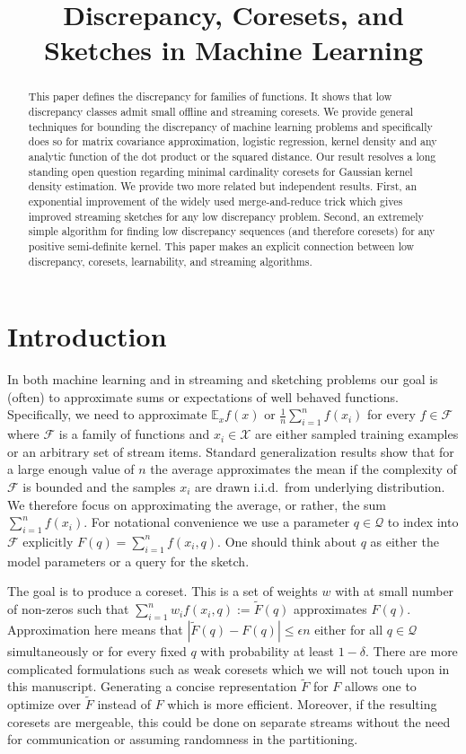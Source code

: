 \documentclass[anon,12pt]{colt2019} %
\title[Discrepancy, Coresets, and Sketches in Machine Learning]{Discrepancy, Coresets, and Sketches in Machine Learning}
\newcommand{\E}{\mathbb{E}}
\newcommand{\eps}{\epsilon}
\newcommand{\F}{\mathcal{F}}
\begin{document}
\maketitle

\begin{abstract}
This paper defines the discrepancy for families of functions.  It shows that low discrepancy classes admit small offline and streaming coresets.
We provide general techniques for bounding the discrepancy of machine learning problems and specifically does so for matrix covariance approximation, logistic regression, kernel density and any analytic function of the dot product or the squared distance.
Our result resolves a long standing open question regarding minimal cardinality coresets for Gaussian kernel density estimation.  
We provide two more related but independent results. 
First, an exponential improvement of the widely used merge-and-reduce trick which gives improved streaming sketches for any low discrepancy problem.
Second, an extremely simple algorithm for finding low discrepancy sequences (and therefore coresets) for any positive semi-definite kernel. 
This paper makes an explicit connection between low discrepancy, coresets, learnability, and streaming algorithms. 
\end{abstract}


\section{Introduction}
In both machine learning and in streaming and sketching problems our goal is (often) to approximate sums or expectations of well behaved functions.
Specifically, we need to approximate $\E_x f(x)$ or $\frac{1}{n}\sum_{i=1}^{n} f(x_i)$ for every $f\in \F$ where $\F$ is a family of functions and $x_i \in \mathcal X$ are either sampled training examples or an arbitrary set of stream items. 
Standard generalization results show that for a large enough value of $n$ the average approximates the mean if the complexity of $\F$ is bounded and the samples $x_i$ are drawn i.i.d.\ from underlying distribution. We therefore focus on approximating the average, or rather, the sum $\sum_{i=1}^{n} f(x_i)$. For notational convenience we use a parameter $q \in \mathcal Q$ to index into $\F$ explicitly $F(q) = \sum_{i=1}^{n} f(x_i, q)$. 
One should think about $q$ as either the model parameters or a query for the sketch. 

The goal is to produce a coreset. This is a set of weights $w$ with at small number of non-zeros such that $\sum_{i=1}^{n}w_i f(x_i,q) := \tilde F(q)$ approximates $F(q)$.
Approximation here means that $|\tilde F(q)  - F(q)| \le \eps n$ either for all $q \in \mathcal Q$ simultaneously or for every fixed $q$ with probability at least $1-\delta$. 
There are more complicated formulations such as weak coresets which we will not touch upon in this manuscript. 
Generating a concise representation $\tilde F$ for $F$ allows one to optimize over $\tilde F$ instead of $F$ which is more efficient. 
Moreover, if the resulting coresets are mergeable, this could be done on separate streams without the need for communication or assuming randomness in the partitioning.
\end{document}
